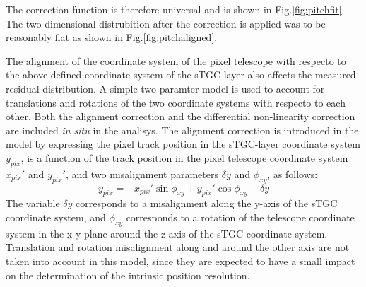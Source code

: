 The correction function is therefore universal and is shown in Fig.\ref{fig:pitchfit}. The two-dimensional
distrubition after the correction is applied was to be reasonably flat as shown in Fig.\ref{fig:pitchaligned}.\par
The alignment of the coordinate system of the pixel telescope with respecto to the above-defined coordinate system of
the sTGC layer also affects the measured residual distribution. A simple two-paramter model is used to account for
translations and rotations of the two coordinate systems with respecto to each other. Both the alignment correction and
the differential non-linearity correction are included {\it in situ} in the analisys. The alignment correction is
introduced in the model by expressing the pixel track position in the sTGC-layer coordinate system $y_{pix}$, is a
function of the track position in the pixel telescope coordinate system $x_{pix}'$ and $y_{pix}'$, and two misalignment
parameters $\delta y$ and $\phi_{xy}$, as follows:
\begin{equation}
y_{pix}=-x_{pix}' \sin \phi_{xy} + y_{pix}'\cos \phi_{xy}+\delta y
\end{equation}
The variable $\delta y$ corresponds to a misalignment along the y-axis of the sTGC coordinate system, and $\phi_{xy}$
corresponds to a rotation of the telescope coordinate system in the x-y plane around the z-axis of the sTGC coordinate
system. Translation and rotation misalignment along and around the other axis are not taken into account in this model,
since they are expected to have a small impact on the determination of the intrinsic position resolution.\par


